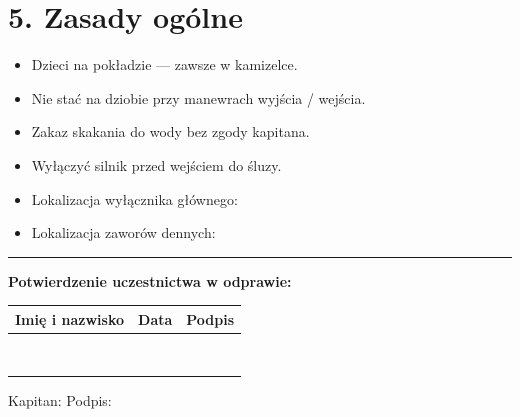\documentclass[a4paper,11pt]{article}
\begin{document}
\section*{5. Zasady ogólne}

\begin{itemize}[noitemsep]
    \item Dzieci na pokładzie — zawsze w kamizelce.
    \item Nie stać na dziobie przy manewrach wyjścia / wejścia.
    \item Zakaz skakania do wody bez zgody kapitana.
    \item Wyłączyć silnik przed wejściem do śluzy.
    \item Lokalizacja wyłącznika głównego: \field{4cm}
    \item Lokalizacja zaworów dennych: \field{5cm}
\end{itemize}

\vspace{0.6cm}
\noindent\rule{\linewidth}{0.4pt}
\vspace{0.2cm}

\noindent\textbf{Potwierdzenie uczestnictwa w odprawie:}

\vspace{0.3cm}
\begin{tabularx}{\linewidth}{|X|X|c|}
\hline
\textbf{Imię i nazwisko} & \textbf{Data} & \textbf{Podpis} \\
\hline
 & & \\[5pt]\hline
 & & \\[5pt]\hline
 & & \\[5pt]\hline
 & & \\[5pt]\hline
 & & \\[5pt]\hline
 & & \\[5pt]\hline
 & & \\[5pt]\hline
 & & \\[5pt]\hline
\end{tabularx}

\vspace{0.5cm}
\noindent Kapitan: \field{6cm} \hfill Podpis: \field{5cm}
\end{document}
